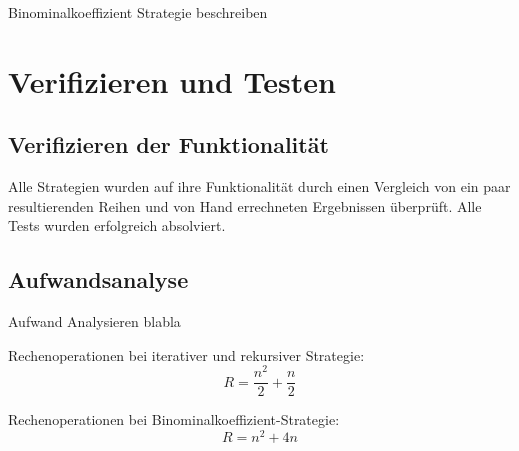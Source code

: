 \documentclass[11pt]{scrartcl}
\begin{document}
		Binominalkoeffizient Strategie beschreiben

\section{Verifizieren und Testen}
\label{sec:vertests}

	\subsection{Verifizieren der Funktionalität}
		\label{sec:verfun}
		
		Alle Strategien wurden auf ihre Funktionalität durch einen Vergleich von ein paar resultierenden Reihen und von Hand errechneten Ergebnissen überprüft.
		Alle Tests wurden erfolgreich absolviert.
	
	\subsection{Aufwandsanalyse}
		\label{sec:aufwand}
		
		Aufwand Analysieren blabla

		Rechenoperationen bei iterativer und rekursiver Strategie:
		\begin{equation*}
		R = \frac{n^2}{2}+\frac{n}{2}
		\end{equation*}

		Rechenoperationen bei Binominalkoeffizient-Strategie:
		\begin{equation*}
		R = n^2+4n
		\end{equation*}
\end{document}
